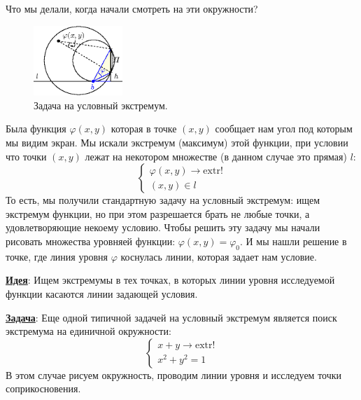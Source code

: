 \documentclass[12pt]{article}
\theoremstyle{definition}
\begin{document}
Что мы делали, когда начали смотреть на эти окружности? 
\begin{figure}[H]
	\centering
	\includegraphics[width=0.3\textwidth]{18_8.eps}
	\caption{Задача на условный экстремум.}
	\label{18_8}
\end{figure}
Была функция $\varphi(x,y)$ которая в точке $(x,y)$ сообщает нам угол под которым мы видим экран. Мы искали экстремум (максимум) этой функции, при условии что точки $(x,y)$ лежат на некотором множестве (в данном случае это прямая) $l$:
$$
\left\{
	\begin{array}{l}
		\varphi(x,y) \to \text{extr}!\\
		(x,y) \in l
	\end{array}
\right.
$$
То есть, мы получили стандартную задачу на условный экстремум: ищем экстремум функции, но при этом разрешается брать не любые точки, а удовлетворяющие некоему условию. Чтобы решить эту задачу мы начали рисовать множества уровняей функции: $\varphi(x,y) = \varphi_0$. И мы нашли решение в точке, где линия уровня $\varphi$ коснулась линии, которая задает нам условие.

\textbf{\uline{Идея}}: Ищем экстремумы в тех точках, в которых линии уровня исследуемой функции касаются линии задающей условия.

\textbf{\uline{Задача}}: Еще одной типичной задачей на условный экстремум является поиск экстремума на единичной окружности:
$$
\left\{
\begin{array}{l}
	x + y \to \text{extr}!\\
	x^2 + y^2  = 1
\end{array}
\right.
$$
В этом случае рисуем окружность, проводим линии уровня и исследуем точки соприкосновения.
\end{document}
